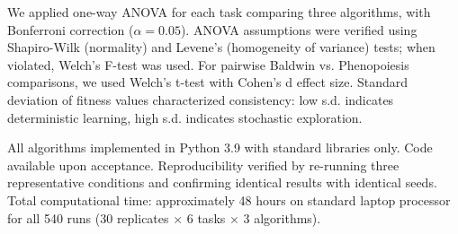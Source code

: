 \documentclass[11pt]{article}
\begin{document}
\begin{table}[h!]
\centering
\small
\caption{Algorithm parameters}
\label{Table:Params}
\end{table}


We applied one-way ANOVA for each task comparing three algorithms, with Bonferroni correction ($\alpha = 0.05$). ANOVA assumptions were verified using Shapiro-Wilk (normality) and Levene's (homogeneity of variance) tests; when violated, Welch's F-test was used. For pairwise Baldwin vs. Phenopoiesis comparisons, we used Welch's t-test with Cohen's d effect size. Standard deviation of fitness values characterized consistency: low s.d. indicates deterministic learning, high s.d. indicates stochastic exploration.


All algorithms implemented in Python 3.9 with standard libraries only. Code available upon acceptance. Reproducibility verified by re-running three representative conditions and confirming identical results with identical seeds. Total computational time: approximately 48 hours on standard laptop processor for all 540 runs (30 replicates × 6 tasks × 3 algorithms).
\end{document}
